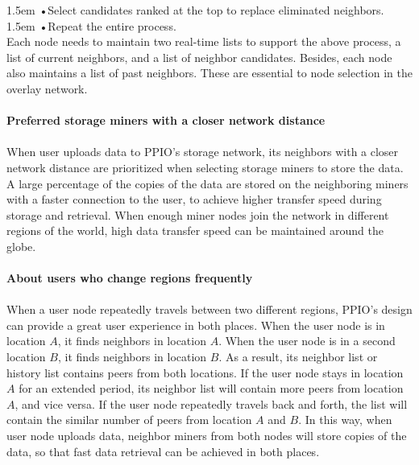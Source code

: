 \documentclass[10pt,a4paper]{article}
\begin{document}
\hangindent 1.5em
\noindent   
•\quad Select candidates ranked at the top to replace eliminated neighbors.
\vspace{-0.8em}
\\

\hangindent 1.5em
\noindent   
•\quad Repeat the entire process.
\vspace{-0.6em}
\\ 

\noindent  
Each node needs to maintain two real-time lists to support the above process, a list of current neighbors, and a list of neighbor candidates. Besides, each node also maintains a list of past neighbors. These are essential to node selection in the overlay network.
\vspace{-0.5em}
\\ \\{\bf Preferred storage miners with a closer network distance}
\vspace{-0.5em}
\\ \\When user uploads data to PPIO's storage network, its neighbors with a closer network distance are prioritized when selecting storage miners to store the data. A large percentage of the copies of the data are stored on the neighboring miners with a faster connection to the user, to achieve higher transfer speed during storage and retrieval. When enough miner nodes join the network in different regions of the world, high data transfer speed can be maintained around the globe.
\vspace{-0.5em}
\\ \\{\bf About users who change regions frequently}
\vspace{-0.5em}
\\ \\When a user node repeatedly travels between two different regions, PPIO’s design can provide a great user experience in both places. When the user node is in location $A$, it finds neighbors in location $A$. When the user node is in a second location $B$, it finds neighbors in location $B$. As a result, its neighbor list or history list contains peers from both locations. If the user node stays in location $A$ for an extended period, its neighbor list will contain more peers from location $A$, and vice versa. If the user node repeatedly travels back and forth, the list will contain the similar number of peers from location $A$ and $B$. In this way, when user node uploads data, neighbor miners from both nodes will store copies of the data, so that fast data retrieval can be achieved in both places.
\end{document}
